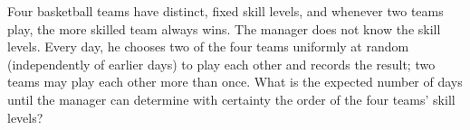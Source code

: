 Four basketball teams have distinct, fixed skill levels, and whenever two teams play, the more skilled team always wins. The manager does not know the skill levels. Every day, he chooses two of the four teams uniformly at random (independently of earlier days) to play each other and records the result; two teams may play each other more than once. What is the expected number of days until the manager can determine with certainty the order of the four teams' skill levels?
